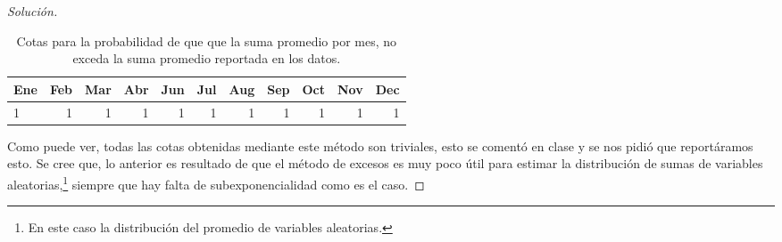 \documentclass[10.5pt,notitlepage]{article}
\newenvironment{solucion}
  {\begin{proof}[Solución]}
  {\end{proof}}
\theoremstyle{plain}
\begin{document}
\begin{solucion}
\begin{table}[H]
\begin{tabular}{@{}l@{\hskip 0.3in}r@{\hskip 0.3in}r@{\hskip 0.3in}r@{\hskip 0.3in}r@{\hskip 0.3in}r@{\hskip 0.3in}r@{\hskip 0.3in}r@{\hskip 0.3in}r@{\hskip 0.3in}r@{\hskip 0.3in}r@{}}
        \toprule
         Ene & Feb & Mar & Abr& Jun & Jul& Aug & Sep &Oct& Nov &Dec  \\
        \midrule         
         1&1&1&1&1&1&1&1&1&1&1
        \end{tabular}
        \caption{Cotas para la probabilidad de que que la suma promedio por mes, no exceda la suma promedio reportada en los datos.}
        \label{tab:8}
\end{table}
Como puede ver, todas las cotas obtenidas mediante este método son triviales, esto se comentó en clase y se nos pidió que reportáramos esto. Se cree que, lo anterior es resultado de que el método de excesos es muy poco útil para estimar la distribución de sumas de variables aleatorias,\footnote{En este caso la distribución del promedio de variables aleatorias.} siempre que hay falta de subexponencialidad como es el caso.
\end{solucion}
\end{document}
